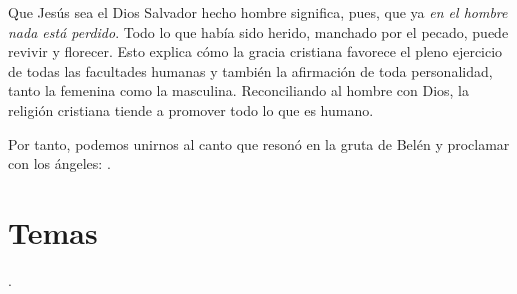\begin{body}
	Que Jesús sea el Dios Salvador hecho hombre significa, pues, que ya \emph{en el hombre nada está perdido}. Todo lo que había sido herido, manchado por el pecado, puede revivir y florecer. Esto explica cómo la gracia cristiana favorece el pleno ejercicio de todas las facultades humanas y también la afirmación de toda personalidad, tanto la femenina como la masculina. Reconciliando al hombre con Dios, la religión cristiana tiende a promover todo lo que es humano.
	
	Por tanto, podemos unirnos al canto que resonó en la gruta de Belén y proclamar con los ángeles: .					
\end{body}

\newsection


\section{Temas}

\temasNavidad.
